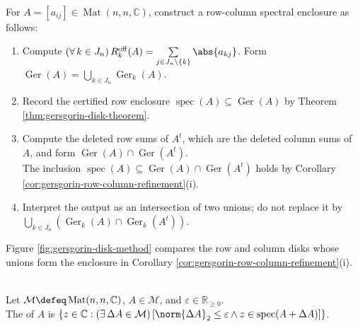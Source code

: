 \begin{computationmethod} \label{meth:gersgorin-disk-localisation} \\
For $A=[a_{ij}]\in\operatorname{Mat}(n,n,\mathbb{C})$, construct a row-column spectral enclosure as follows:
\begin{enumerate}[label=(\roman*)]
\setlength{\itemsep}{0pt}
\item Compute $(\forall\,k\in J_n)\,R_k^{\mathrm{off}}(A)=\sum\limits_{j\in J_n\setminus\{k\}}\abs{a_{kj}}$. Form $\operatorname{Ger}(A)=\bigcup\limits_{k\in J_n}\operatorname{Ger}_k(A)$.
\item Record the certified row enclosure $\operatorname{spec}(A)\subseteq\operatorname{Ger}(A)$ by Theorem \ref{thm:gersgorin-disk-theorem}.
\item Compute the deleted row sums of $A^t$, which are the deleted column sums of $A$, and form $\operatorname{Ger}(A)\cap\operatorname{Ger}(A^t)$.\\
The inclusion $\operatorname{spec}(A)\subseteq\operatorname{Ger}(A)\cap\operatorname{Ger}(A^t)$ holds by Corollary \ref{cor:gersgorin-row-column-refinement}(i).
\item Interpret the output as an intersection of two unions; do not replace it by $\bigcup\limits_{k\in J_n}(\operatorname{Ger}_k(A)\cap\operatorname{Ger}_k(A^t))$.
\end{enumerate}
\end{computationmethod}

Figure \ref{fig:gersgorin-disk-method} compares the row and column disks whose unions form the enclosure in Corollary \ref{cor:gersgorin-row-column-refinement}(i).

\begin{illustrationfigure}[H]
  \centering
  
  \caption{Solid blue row disks and dashed green column disks form $\operatorname{Ger}(A)\cap\operatorname{Ger}(A^t)$; red markers show candidate eigenvalues.}
  \label{fig:gersgorin-disk-method}
\end{illustrationfigure}

\begin{definition} \label{def:closed-spectral-norm-pseudospectrum} \\
Let $\mathcal{M}\defeq\operatorname{Mat}(n,n,\mathbb{C})$, $A\in\mathcal{M}$, and $\varepsilon\in\mathbb{R}_{\geq0}$.\\
The  of $A$ is $\{z\in\mathbb{C}:(\exists\,\Delta A\in\mathcal{M})\,[\norm{\Delta A}_2\leq\varepsilon\land z\in\operatorname{spec}(A+\Delta A)]\}$.
\end{definition}

